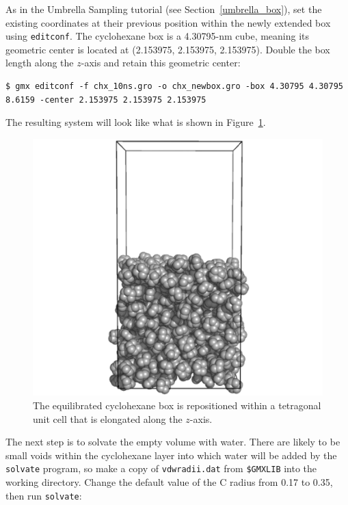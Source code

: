\documentclass[9pt,tutorial,pubversion]{livecoms}
\begin{document}
As in the Umbrella Sampling tutorial (see Section~\ref{umbrella_box}), set the existing coordinates at their previous position within the newly extended box using \texttt{editconf}. The cyclohexane box is a 4.30795-nm cube, meaning its geometric center is located at (2.153975, 2.153975, 2.153975). Double the box length along the $z$-axis and retain this geometric center:

\begin{lstlisting}
$ gmx editconf -f chx_10ns.gro -o chx_newbox.gro -box 4.30795 4.30795 8.6159 -center 2.153975 2.153975 2.153975
\end{lstlisting}

The resulting system will look like what is shown in Figure~\ref{biphasic_system_newbox_fig}.

\begin{figure}[h!]
\centering
\includegraphics{biphasic_system_newbox}
\caption{The equilibrated cyclohexane box is repositioned within a tetragonal unit cell that is elongated along the $z$-axis.}
\label{biphasic_system_newbox_fig}
\end{figure}

The next step is to solvate the empty volume with water. There are likely to be small voids within the cyclohexane layer into which water will be added by the \texttt{solvate} program, so make a copy of \texttt{vdwradii.dat} from \texttt{\$GMXLIB} into the working directory. Change the default value of the C radius from 0.17 to 0.35, then run \texttt{solvate}:
\end{document}
